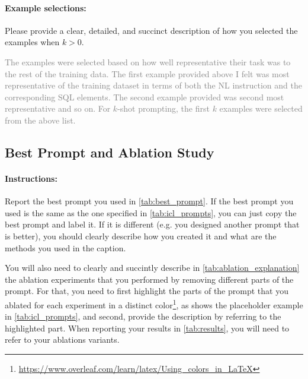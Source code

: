 \documentclass{article}
\begin{document}
\paragraph{Example selections:} Please provide a clear, detailed, and succinct description of how you selected the examples when $k > 0$.

\textcolor{gray}{The examples were selected based on how well representative their task was to the rest of the training data. The first example provided above I felt was most representative of the training dataset in terms of both the NL instruction and the corresponding SQL elements. The second example provided was second most representative and so on. For $k$-shot prompting, the first $k$ examples were selected from the above list.}



\newpage



\subsection{Best Prompt and Ablation Study}



\paragraph{Instructions:} Report the best prompt you used in \autoref{tab:best_prompt}.
If the best prompt you used is the same as the one specified in \autoref{tab:icl_prompts}, you can just copy the best prompt and label it.
If it is different (e.g. you designed another prompt that is better), you should clearly describe how you created it and what are the methods you used in the caption.

You will also need to clearly and succintly describe in \autoref{tab:ablation_explanation} the ablation experiments that you performed by removing different parts of the prompt.
For that, you need to first highlight the parts of the prompt that you ablated for each experiment in a distinct color\footnote{\url{https://www.overleaf.com/learn/latex/Using_colors_in_LaTeX}}, as shows the placeholder example in \autoref{tab:icl_prompts}, and second, provide the description by referring to the highlighted part.
When reporting your results in \autoref{tab:results}, you will need to refer to your ablations variants.
\end{document}

